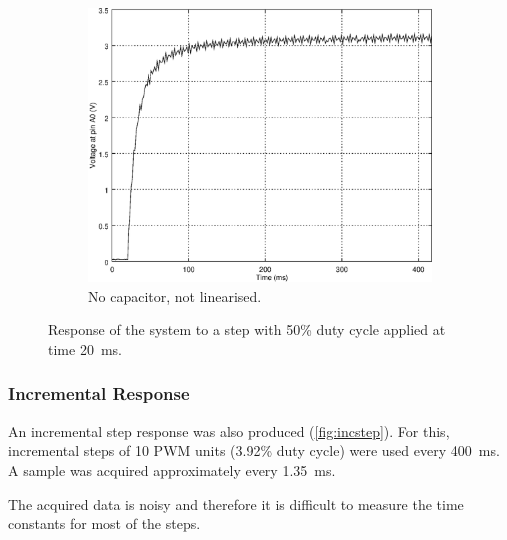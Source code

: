 \begin{figure}[h]
    \begin{subfigure}[t]{0.49\textwidth}
	\centering
	\includegraphics[width=.95\textwidth]{img/step_response_no_capacitor}
	\caption{No capacitor, not linearised.}
	\label{fig:step_response_no_capacitor}
    \end{subfigure}
    \caption{Response of the system to a step with 50\% duty cycle applied at time \SI{20}{\milli\second}.}
\end{figure}

\subsubsection{Incremental Response}
\label{sub:IncrementalResponse}

An incremental step response was also produced (\autoref{fig:incstep}). For this, incremental steps of 10 PWM units (3.92\% duty cycle) were used every \SI{400}{\milli\second}. A sample was acquired approximately every \SI{1.35}{\milli\second}.

The acquired data is noisy and therefore it is difficult to measure the time constants for most of the steps.

